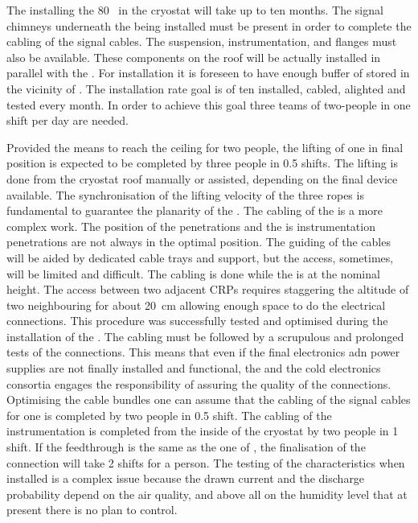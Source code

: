 The installing the 80~ in the cryostat will take up to ten months.
The signal chimneys underneath the  being installed must be present in order to complete the cabling of the signal cables.
The suspension, instrumentation, and  flanges must also be available.
These components on the roof will be actually installed in parallel with the .
For installation it is foreseen to have enough buffer of  stored in the vicinity of .
The installation rate goal is of ten  installed, cabled, alighted and tested every month.
In order to achieve this goal three teams of two-people in one shift per day are needed.

Provided the means to reach the ceiling for two people, the lifting of one  in final position is expected to be completed by three people in 0.5 shifts.
The lifting is done from the cryostat roof manually or assisted, depending on the final device available.
The synchronisation of the lifting velocity of the three ropes is fundamental to guarantee the planarity of the .
The cabling of the  is a more complex work.
The position of the  penetrations and the is  instrumentation penetrations are not always in the optimal position.
The guiding of the cables will be aided by dedicated cable trays and support, but the access, sometimes, will be limited and difficult.
The cabling is done while the  is at the nominal height.
The access between two adjacent CRPs requires staggering the altitude of two neighbouring  for about 20~cm allowing enough space to do the electrical connections.
This procedure was successfully tested and optimised during the installation of the .
The cabling must be followed by a scrupulous and prolonged tests of the connections.
This means that even if the final electronics adn power supplies are not finally installed and functional, the  and the cold electronics consortia engages the responsibility of assuring the quality of the connections. 
Optimising the cable bundles one can assume that the cabling of the signal cables for one  is completed by two people in 0.5 shift.
The cabling of the  instrumentation is completed from the inside of the cryostat by two people in 1 shift.
If the   feedthrough is the same as the one of , the finalisation of the connection will take 2 shifts for a person.
The testing of the   characteristics when installed is a complex issue because the drawn current and the discharge probability depend on the air quality, and above all on the humidity level that at present there is no plan to control.
